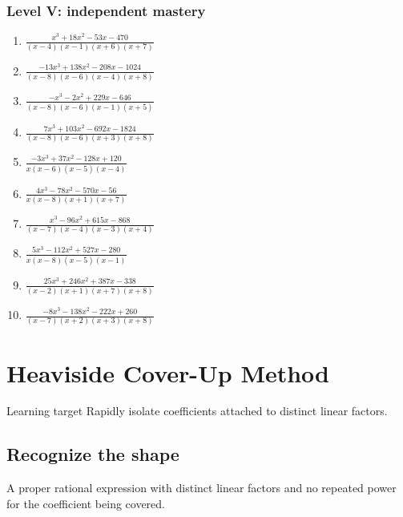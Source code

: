 \documentclass[11pt,oneside]{book}
\begin{document}
\subsection*{Level V: independent mastery}
\begin{enumerate}[leftmargin=*,label=\textbf{\arabic*.},itemsep=0.65\baselineskip]
\item $\displaystyle \frac{x^{3} + 18 x^{2} - 53 x - 470}{\left(x - 4\right) \left(x - 1\right) \left(x + 6\right) \left(x + 7\right)}$
\item $\displaystyle \frac{- 13 x^{3} + 138 x^{2} - 208 x - 1024}{\left(x - 8\right) \left(x - 6\right) \left(x - 4\right) \left(x + 8\right)}$
\item $\displaystyle \frac{- x^{3} - 2 x^{2} + 229 x - 646}{\left(x - 8\right) \left(x - 6\right) \left(x - 1\right) \left(x + 5\right)}$
\item $\displaystyle \frac{7 x^{3} + 103 x^{2} - 692 x - 1824}{\left(x - 8\right) \left(x - 6\right) \left(x + 3\right) \left(x + 8\right)}$
\item $\displaystyle \frac{- 3 x^{3} + 37 x^{2} - 128 x + 120}{x \left(x - 6\right) \left(x - 5\right) \left(x - 4\right)}$
\item $\displaystyle \frac{4 x^{3} - 78 x^{2} - 570 x - 56}{x \left(x - 8\right) \left(x + 1\right) \left(x + 7\right)}$
\item $\displaystyle \frac{x^{3} - 96 x^{2} + 615 x - 868}{\left(x - 7\right) \left(x - 4\right) \left(x - 3\right) \left(x + 4\right)}$
\item $\displaystyle \frac{5 x^{3} - 112 x^{2} + 527 x - 280}{x \left(x - 8\right) \left(x - 5\right) \left(x - 1\right)}$
\item $\displaystyle \frac{25 x^{3} + 246 x^{2} + 387 x - 338}{\left(x - 2\right) \left(x + 1\right) \left(x + 7\right) \left(x + 8\right)}$
\item $\displaystyle \frac{- 8 x^{3} - 138 x^{2} - 222 x + 260}{\left(x - 7\right) \left(x + 2\right) \left(x + 3\right) \left(x + 8\right)}$
\end{enumerate}
\chapter{Heaviside Cover-Up Method}
\begin{rulebox}{Learning target}
Rapidly isolate coefficients attached to distinct linear factors.
\end{rulebox}
\section{Recognize the shape}
A proper rational expression with distinct linear factors and no repeated power for the coefficient being covered.
\end{document}
